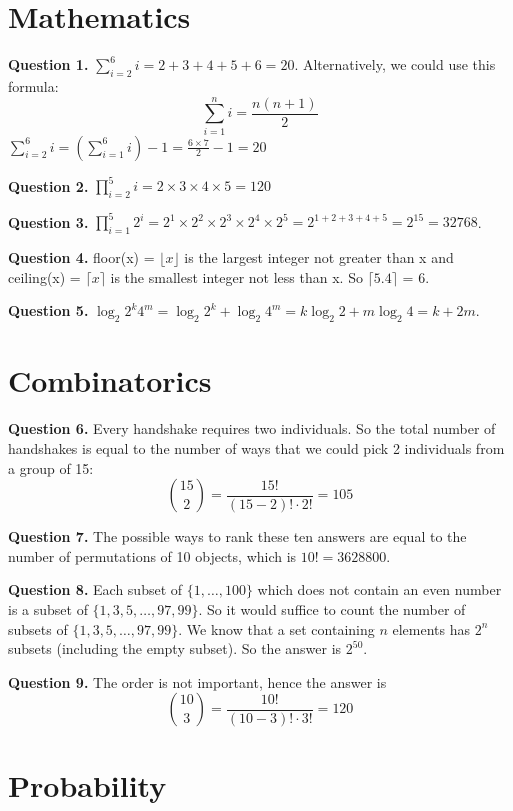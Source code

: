 \documentclass[10pt,a4paper]{article}
\newcommand{\question}[1]{\bigskip \noindent \textbf{Question #1.}}
\begin{document}
\section{Mathematics}
\question{1} $\sum_{i=2}^6 i = 2 + 3 + 4 + 5 + 6 = 20$. Alternatively, we could use this formula:
\begin{equation*}
\sum_{i=1}^n i = \frac{n(n+1)}{2}
\end{equation*}
$\sum_{i=2}^6 i = \left(\sum_{i=1}^6 i\right) - 1 = \frac{6 \times 7}{2} - 1 = 20	$

\question{2} $\prod_{i=2}^5 i = 2 \times 3 \times 4 \times 5 = 120$

\question{3} $\prod_{i=1}^5 2^i = 2^1 \times 2^2 \times 2^3 \times 2^4 \times 2^5 = 2^{1 + 2 + 3 + 4 + 5} = 2^{15} = 32768$. 

\question{4}  floor(x) = $\lfloor x\rfloor$ is the largest integer not greater than x and ceiling(x) = $\lceil x \rceil$ is the smallest integer not less than x. So $\lceil 5.4 \rceil$ = 6.

\question{5} $\log_2{2^k 4^m} = \log_2{2^k} + \log_2{4^m} = k \log_2{2} + m \log_2{4} = k + 2m$.

\section{Combinatorics}
\question{6} Every handshake requires two individuals. So the total number of handshakes is equal to the number of ways that we could pick 2 individuals from a group of 15:
\begin{equation*}
\binom{15}{2} = \frac{15!}{(15 - 2)! \cdot 2!} = 105
\end{equation*}

\question{7} The possible ways to rank these ten answers are equal to the number of permutations of 10 objects, which is $10! = 3628800$.

\question{8} Each subset of $\{1 , \ldots , 100\}$ which does not contain an even number is a subset of $\{1, 3, 5, \ldots , 97, 99\}$. So it would suffice to count the number of subsets of $\{1, 3, 5, \ldots , 97, 99\}$. We know that a set containing $n$ elements has $2^n$ subsets (including the empty subset). So the answer is $2^{50}$.

\question{9} The order is not important, hence the answer is
\begin{equation*}
\binom{10}{3} = \frac{10!}{(10-3)! \cdot 3!} = 120
\end{equation*}

\section{Probability}
\end{document}
